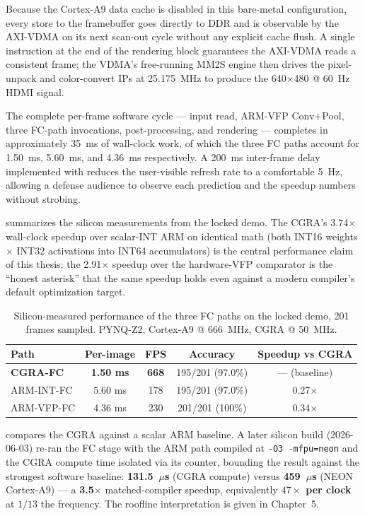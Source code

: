 Because the Cortex-A9 data cache is disabled in this bare-metal
configuration, every store to the framebuffer goes directly to DDR
and is observable by the AXI-VDMA on its next scan-out cycle without
any explicit cache flush. A single  instruction at the end
of the rendering block guarantees the AXI-VDMA reads a consistent
frame; the VDMA's free-running MM2S engine then drives the
pixel-unpack and color-convert IPs at 25.175~MHz to produce the
640$\times$480 @ 60~Hz HDMI signal.

The complete per-frame software cycle --- input read, ARM-VFP
Conv$+$Pool, three FC-path invocations, post-processing, and rendering
--- completes in approximately 35~ms of wall-clock work, of which the
three FC paths account for 1.50~ms, 5.60~ms, and 4.36~ms respectively.
A 200~ms inter-frame delay implemented with
 reduces the user-visible refresh
rate to a comfortable 5~Hz, allowing a defense audience to observe
each prediction and the speedup numbers without strobing.

 summarizes the silicon measurements from the locked
demo. The CGRA's 3.74$\times$ wall-clock speedup over scalar-INT ARM
on identical math (both INT16 weights $\times$ INT32 activations into
INT64 accumulators) is the central performance claim of this thesis;
the 2.91$\times$ speedup over the hardware-VFP comparator is the
``honest asterisk'' that the same speedup holds even against a
modern compiler's default optimization target.

\begin{table}[H]
\centering
\caption{Silicon-measured performance of the three FC paths on the
locked demo, 201 frames sampled. PYNQ-Z2, Cortex-A9 @ 666~MHz, CGRA
@ 50~MHz.}
\label{tab:perf}
\small
\begin{tabular}{l c c c c}
\toprule
\textbf{Path} & \textbf{Per-image} & \textbf{FPS} & \textbf{Accuracy} & \textbf{Speedup vs CGRA} \\
\midrule
\textbf{CGRA-FC}   & \textbf{1.50 ms} & \textbf{668} & 195/201 (97.0\%) & --- (baseline) \\
ARM-INT-FC         & 5.60 ms         & 178          & 195/201 (97.0\%) & 0.27$\times$ \\
ARM-VFP-FC         & 4.36 ms         & 230          & 201/201 (100\%)  & 0.34$\times$ \\
\bottomrule
\end{tabular}
\end{table}

 compares the CGRA against a scalar ARM baseline. A
later silicon build (2026-06-03) re-ran the FC stage with the ARM path
compiled at \texttt{-O3 -mfpu=neon} and the CGRA compute time isolated
via its  counter, bounding the result against the
strongest software baseline: \textbf{131.5~$\mu$s} (CGRA compute) versus
\textbf{459~$\mu$s} (NEON Cortex-A9) --- a \textbf{3.5$\times$}
matched-compiler speedup, equivalently \textbf{$47\times$ per clock} at
$1/13$ the frequency. The roofline interpretation is given in Chapter~5.


